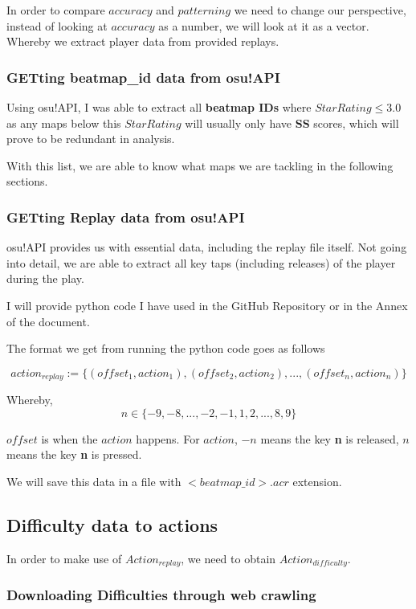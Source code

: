 \documentclass{article}
\begin{document}
In order to compare $accuracy$ and $patterning$ we need to change our perspective, instead of looking at $accuracy$ as a number, we will look at it as a vector. Whereby we extract player data from provided replays.

\subsubsection{GETting beatmap\_id data from osu!API}

Using osu!API, I was able to extract all \textbf{beatmap IDs} where $ Star Rating \leq 3.0 $ as any maps below this $Star Rating$ will usually only have \textbf{SS} scores, which will prove to be redundant in analysis.

With this list, we are able to know what maps we are tackling in the following sections.

\subsubsection{GETting Replay data from osu!API}

osu!API provides us with essential data, including the replay file itself. Not going into detail, we are able to extract all key taps (including releases) of the player during the play.

I will provide python code I have used in the GitHub Repository or in the Annex of the document.

The format we get from running the python code goes as follows

$$ action_{replay} := \lbrace(offset_1, action_1), (offset_2, action_2), ... , (offset_n, action_n)\rbrace $$

Whereby, 
$$n \in \lbrace-9, -8, ... , -2, -1, 1, 2, ... , 8, 9\rbrace$$

$offset$ is when the $action$ happens. For $action$, $-n$ means the key \textbf{n} is released, $n$ means the key \textbf{n} is pressed.

We will save this data in a file with $<beatmap\_id>.acr$ extension.

\subsection{Difficulty data to actions}

In order to make use of $Action_{replay}$, we need to obtain $Action_{difficulty}$.

\subsubsection{Downloading Difficulties through web crawling}
\end{document}
